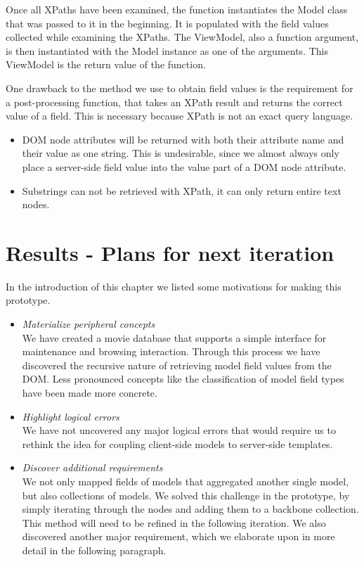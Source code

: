 Once all XPaths have been examined, the function instantiates the Model class
that was passed to it in the beginning. It is populated with the field values
collected while examining the XPaths.
The ViewModel, also a function argument, is then instantiated with
the Model instance as one of the arguments.
This ViewModel is the return value of the function.

One drawback to the method we use to obtain field values is the requirement
for a post-processing function, that takes an XPath result and
returns the correct value of a field.
This is necessary because XPath is not an exact query language.
\begin{itemize}
	\item DOM node attributes will be returned with both their attribute name and
	their value as one string. This is undesirable, since we almost always only
	place a server-side field value into the value part of a DOM node attribute.
	\item Substrings can not be retrieved with XPath, it can only return entire
	text nodes.
\end{itemize}

\section{Results - Plans for next iteration}

In the introduction of this chapter we listed some motivations for making
this prototype.

\begin{itemize}
	\item \emph{Materialize peripheral concepts}\\
	We have created a movie database that supports a simple interface
	for maintenance and browsing interaction.
	Through this process we have discovered the recursive nature of retrieving
	model field values from the DOM.
	Less pronounced concepts like the classification of model field types have 
	been made more concrete.
	\item \emph{Highlight logical errors}\\
	We have not uncovered any major logical errors that would require us to
	rethink the idea for coupling client-side models to server-side templates.
	\item \emph{Discover additional requirements}\\
	We not only mapped fields of models that aggregated another single model,
	but also collections of models. We solved this challenge in the prototype,
	by simply iterating through the nodes and adding them to
	a backbone collection. This method will need to be refined in the following
	iteration.
	We also discovered another major requirement, which we elaborate upon in more
	detail in the following paragraph.
\end{itemize}

